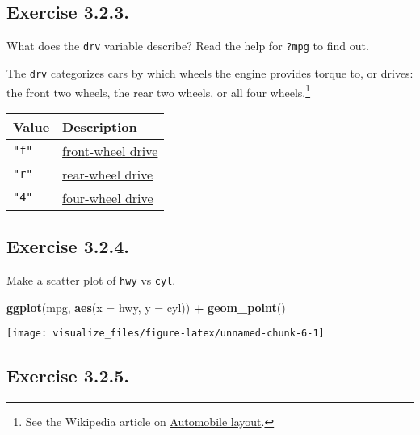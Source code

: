 \documentclass[]{book}
\newenvironment{Shaded}{\begin{snugshade}}{\end{snugshade}}
\newcommand{\DataTypeTok}[1]{\textcolor[rgb]{0.13,0.29,0.53}{#1}}
\newcommand{\KeywordTok}[1]{\textcolor[rgb]{0.13,0.29,0.53}{\textbf{#1}}}
\newcommand{\NormalTok}[1]{#1}
\newcommand{\OperatorTok}[1]{\textcolor[rgb]{0.81,0.36,0.00}{\textbf{#1}}}
\newcommand{\StringTok}[1]{\textcolor[rgb]{0.31,0.60,0.02}{#1}}
\let\rmarkdownfootnote\footnote%
\def\footnote{\protect\rmarkdownfootnote}
\theoremstyle{plain}
\theoremstyle{remark}
\begin{document}
\hypertarget{exercise-3.2.3.}{%
\subsection*{\texorpdfstring{Exercise
{3.2.3}.}{Exercise 3.2.3.}}\label{exercise-3.2.3.}}

What does the \texttt{drv} variable describe? Read the help for
\texttt{?mpg} to find out.

The \texttt{drv} categorizes cars by which wheels the engine provides
torque to, or drives: the front two wheels, the rear two wheels, or all
four wheels.\footnote{See the Wikipedia article on
  \href{https://en.wikipedia.org/wiki/Automobile_layout}{Automobile
  layout}.}

\begin{longtable}[]{@{}ll@{}}
\toprule
Value & Description\tabularnewline
\midrule
\endhead
\texttt{"f"} &
\href{https://en.wikipedia.org/wiki/Front-wheel_drive}{front-wheel
drive}\tabularnewline
\texttt{"r"} &
\href{https://en.wikipedia.org/wiki/Automobile_layout\#Rear-wheel-drive_layouts}{rear-wheel
drive}\tabularnewline
\texttt{"4"} &
\href{https://en.wikipedia.org/wiki/Four-wheel_drive}{four-wheel
drive}\tabularnewline
\bottomrule
\end{longtable}

\hypertarget{exercise-3.2.4.}{%
\subsection*{\texorpdfstring{Exercise
{3.2.4}.}{Exercise 3.2.4.}}\label{exercise-3.2.4.}}

Make a scatter plot of \texttt{hwy} vs \texttt{cyl}.

\begin{Shaded}
\begin{Highlighting}[]
\KeywordTok{ggplot}\NormalTok{(mpg, }\KeywordTok{aes}\NormalTok{(}\DataTypeTok{x =}\NormalTok{ hwy, }\DataTypeTok{y =}\NormalTok{ cyl)) }\OperatorTok{+}
\StringTok{  }\KeywordTok{geom_point}\NormalTok{()}
\end{Highlighting}
\end{Shaded}

\begin{center}\texttt{[image: visualize\_files/figure-latex/unnamed-chunk-6-1]} \end{center}

\hypertarget{exercise-3.2.5.}{%
\subsection*{\texorpdfstring{Exercise
{3.2.5}.}{Exercise 3.2.5.}}\label{exercise-3.2.5.}}
\end{document}
